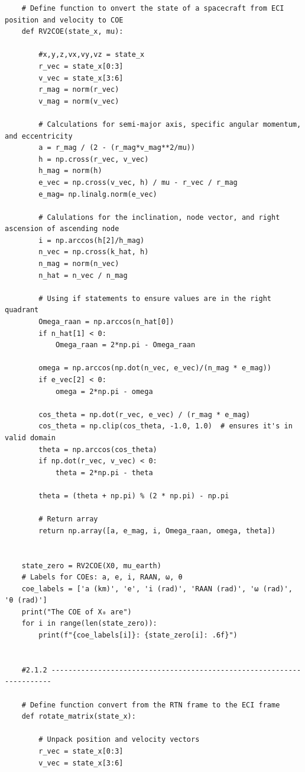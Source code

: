 \documentclass[12pt,twocolumn]{article}  %
\begin{document}
\begin{lstlisting}
    # Define function to onvert the state of a spacecraft from ECI position and velocity to COE
    def RV2COE(state_x, mu):
        
        #x,y,z,vx,vy,vz = state_x
        r_vec = state_x[0:3]
        v_vec = state_x[3:6]
        r_mag = norm(r_vec)
        v_mag = norm(v_vec)
        
        # Calculations for semi-major axis, specific angular momentum, and eccentricity
        a = r_mag / (2 - (r_mag*v_mag**2/mu))
        h = np.cross(r_vec, v_vec)
        h_mag = norm(h)
        e_vec = np.cross(v_vec, h) / mu - r_vec / r_mag
        e_mag= np.linalg.norm(e_vec)
        
        # Calulations for the inclination, node vector, and right ascension of ascending node
        i = np.arccos(h[2]/h_mag)
        n_vec = np.cross(k_hat, h)
        n_mag = norm(n_vec)
        n_hat = n_vec / n_mag
        
        # Using if statements to ensure values are in the right quadrant
        Omega_raan = np.arccos(n_hat[0])
        if n_hat[1] < 0:
            Omega_raan = 2*np.pi - Omega_raan
    
        omega = np.arccos(np.dot(n_vec, e_vec)/(n_mag * e_mag))
        if e_vec[2] < 0:
            omega = 2*np.pi - omega
            
        cos_theta = np.dot(r_vec, e_vec) / (r_mag * e_mag)
        cos_theta = np.clip(cos_theta, -1.0, 1.0)  # ensures it's in valid domain
        theta = np.arccos(cos_theta)
        if np.dot(r_vec, v_vec) < 0:
            theta = 2*np.pi - theta
            
        theta = (theta + np.pi) % (2 * np.pi) - np.pi
        
        # Return array
        return np.array([a, e_mag, i, Omega_raan, omega, theta])
        
        
    state_zero = RV2COE(X0, mu_earth)
    # Labels for COEs: a, e, i, RAAN, ω, θ
    coe_labels = ['a (km)', 'e', 'i (rad)', 'RAAN (rad)', 'ω (rad)', 'θ (rad)']
    print("The COE of X₀ are")
    for i in range(len(state_zero)):
        print(f"{coe_labels[i]}: {state_zero[i]: .6f}")
    
        
    #2.1.2 ----------------------------------------------------------------------
    
    # Define function convert from the RTN frame to the ECI frame
    def rotate_matrix(state_x):
        
        # Unpack position and velocity vectors
        r_vec = state_x[0:3]
        v_vec = state_x[3:6]
        

\end{lstlisting}
\end{document}
